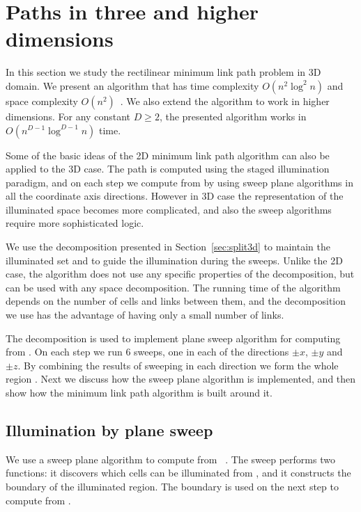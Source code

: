 \documentclass[english,gradu]{tktltiki2018}
\begin{document}
\section{Paths in three and higher dimensions}\label{sec:minlink3d}

In this section we study the rectilinear minimum link path problem in 3D domain.
We present an algorithm that has time complexity $O(n^2\log^2n)$ and space complexity $O(n^2)$~\cite{restricted}.
We also extend the algorithm to work in higher dimensions.
For any constant $D\ge 2$, the presented algorithm works in $O(n^{D-1}\log^{D-1}n)$ time.

Some of the basic ideas of the 2D minimum link path algorithm can also be applied to the 3D case.
The path is computed using the staged illumination paradigm, and on each step we compute  from  by using sweep plane algorithms in all the coordinate axis directions.
However in 3D case the representation of the illuminated space becomes more complicated, and also the sweep algorithms require more sophisticated logic.

We use the decomposition presented in Section~\ref{sec:split3d} to maintain the illuminated set and to guide the illumination during the sweeps.
Unlike the 2D case, the algorithm does not use any specific properties of the decomposition, but can be used with any space decomposition.
The running time of the algorithm depends on the number of cells and links between them, and the decomposition we use has the advantage of having only a small number of links.

The decomposition is used to implement plane sweep algorithm for computing  from .
On each step we run 6 sweeps, one in each of the directions $\pm x$, $\pm y$ and $\pm z$.
By combining the results of sweeping in each direction we form the whole region .
Next we discuss how the sweep plane algorithm is implemented, and then show how the minimum link path algorithm is built around it.

\subsection{Illumination by plane sweep}

We use a sweep plane algorithm to compute  from ~\cite{restricted}.
The sweep performs two functions: it discovers which cells can be illuminated from , and it constructs the boundary of the illuminated region.
The boundary is used on the next step to compute  from .
\end{document}
